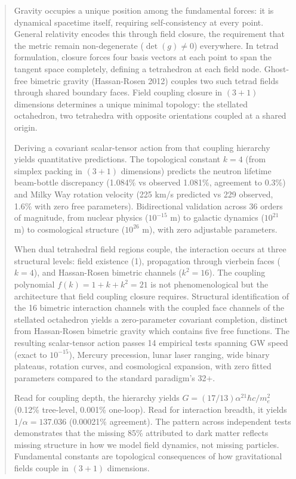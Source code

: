 \documentclass[aps,prd,preprint,superscriptaddress,showpacs,preprintnumbers,amsmath,amssymb,nofootinbib]{revtex4-2}
\begin{document}
\begin{abstract}
Gravity occupies a unique position among the fundamental forces: it is dynamical spacetime itself, requiring self-consistency at every point. General relativity encodes this through field closure, the requirement that the metric remain non-degenerate ($\det(g) \neq 0$) everywhere. In tetrad formulation, closure forces four basis vectors at each point to span the tangent space completely, defining a tetrahedron at each field node. Ghost-free bimetric gravity (Hassan-Rosen 2012) couples two such tetrad fields through shared boundary faces. Field coupling closure in $(3{+}1)$ dimensions determines a unique minimal topology: the stellated octahedron, two tetrahedra with opposite orientations coupled at a shared origin.

Deriving a covariant scalar-tensor action from that coupling hierarchy yields quantitative predictions. The topological constant $k = 4$ (from simplex packing in $(3{+}1)$ dimensions) predicts the neutron lifetime beam-bottle discrepancy (1.084\% vs observed 1.081\%, agreement to 0.3\%) and Milky Way rotation velocity (225 km/s predicted vs 229 observed, 1.6\% with zero free parameters). Bidirectional validation across 36 orders of magnitude, from nuclear physics ($10^{-15}$ m) to galactic dynamics ($10^{21}$ m) to cosmological structure ($10^{26}$ m), with zero adjustable parameters.

When dual tetrahedral field regions couple, the interaction occurs at three structural levels: field existence (1), propagation through vierbein faces ($k = 4$), and Hassan-Rosen bimetric channels ($k^2 = 16$). The coupling polynomial $f(k) = 1 + k + k^2 = 21$ is not phenomenological but the architecture that field coupling closure requires. Structural identification of the 16 bimetric interaction channels with the coupled face channels of the stellated octahedron yields a zero-parameter covariant completion, distinct from Hassan-Rosen bimetric gravity which contains five free functions. The resulting scalar-tensor action passes 14 empirical tests spanning GW speed (exact to $10^{-15}$), Mercury precession, lunar laser ranging, wide binary plateaus, rotation curves, and cosmological expansion, with zero fitted parameters compared to the standard paradigm's 32+.

Read for coupling depth, the hierarchy yields $G = (17/13)\alpha^{21} \hbar c/m_e^2$ (0.12\% tree-level, 0.001\% one-loop). Read for interaction breadth, it yields $1/\alpha = 137.036$ (0.00021\% agreement). The pattern across independent tests demonstrates that the missing 85\% attributed to dark matter reflects missing structure in how we model field dynamics, not missing particles. Fundamental constants are topological consequences of how gravitational fields couple in $(3{+}1)$ dimensions.
\end{abstract}
\end{document}
